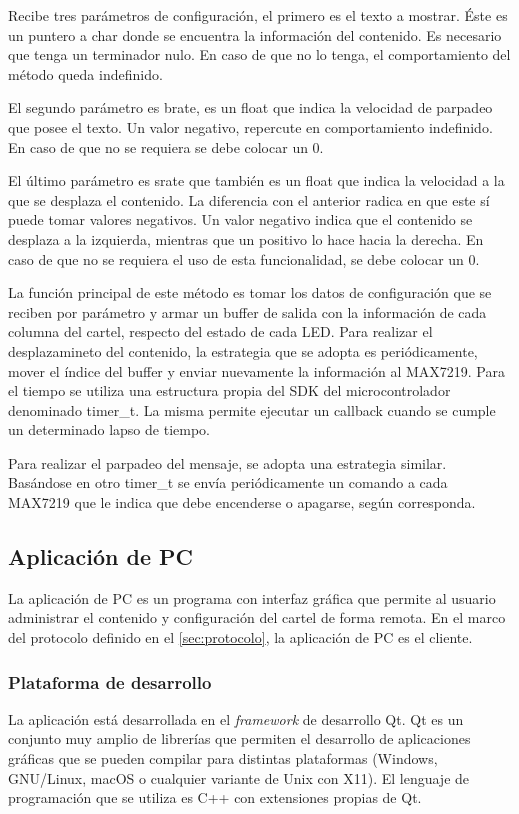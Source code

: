 Recibe tres parámetros de configuración, el primero es el texto a mostrar.
Éste es un puntero a char donde se encuentra la información del contenido.
Es necesario que tenga un terminador nulo.
En caso de que no lo tenga, el comportamiento del método queda indefinido.

El segundo parámetro es brate, es un float que indica la velocidad de parpadeo que posee el texto.
Un valor negativo, repercute en comportamiento indefinido.
En caso de que no se requiera se debe colocar un 0.

El último parámetro es srate que también es un float que indica la velocidad a la que se desplaza el contenido.
La diferencia con el anterior radica en que este sí puede tomar valores negativos.
Un valor negativo indica que el contenido se desplaza a la izquierda, mientras que un positivo lo hace hacia la derecha.
En caso de que no se requiera el uso de esta funcionalidad, se debe colocar un 0. 

La función principal de este método es tomar los datos de configuración que se reciben por parámetro y armar un buffer de salida con la información de cada columna del cartel, respecto del estado de cada LED.
Para realizar el desplazamineto del contenido, la estrategia que se adopta es periódicamente, mover el índice del buffer y enviar nuevamente la información al MAX7219.
Para el tiempo se utiliza una estructura propia del SDK del microcontrolador denominado timer\_t.
La misma permite ejecutar un callback cuando se cumple un determinado lapso de tiempo.

Para realizar el parpadeo del mensaje, se adopta una estrategia similar.
Basándose en otro timer\_t se envía periódicamente un comando a cada MAX7219 que le indica que debe encenderse o apagarse, según corresponda.


\subsection{Aplicación de PC}\label{sec:pc}
La aplicación de PC es un programa con interfaz gráfica que permite al usuario administrar el contenido y configuración del cartel de forma remota. En el marco del protocolo definido en el \ref{sec:protocolo}, la aplicación de PC es el cliente.

\subsubsection{Plataforma de desarrollo}
La aplicación está desarrollada en el \emph{framework} de desarrollo Qt. Qt es un conjunto muy amplio de librerías que permiten el desarrollo de aplicaciones gráficas que se pueden compilar para distintas plataformas (Windows, GNU/Linux, macOS o cualquier variante de Unix con X11). El lenguaje de programación que se utiliza es C++ con extensiones propias de Qt.

